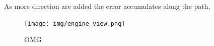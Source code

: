 


As more direction are added the error accumulates along the path, 
\begin{figure}
    \centering
    \texttt{[image: img/engine\_view.png]}
    \caption{OMG}
    \label{fig:results:engine_view}
\end{figure}







